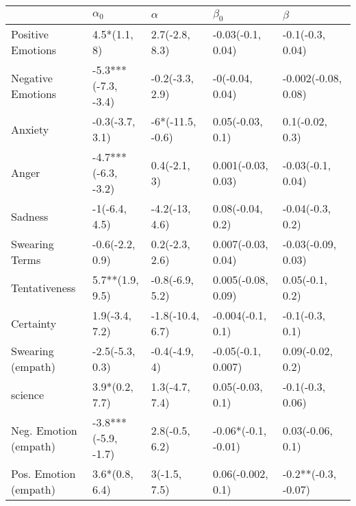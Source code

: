 \begin{tabular}{lllll}
\toprule
{} &           $\alpha_0$ &          $\alpha$ &            $\beta_0$ &              $\beta$ \\
\midrule
Positive Emotions     &         4.5*(1.1, 8) &    2.7(-2.8, 8.3) &    -0.03(-0.1, 0.04) &     -0.1(-0.3, 0.04) \\
Negative Emotions     &  -5.3***(-7.3, -3.4) &   -0.2(-3.3, 2.9) &      -0(-0.04, 0.04) &  -0.002(-0.08, 0.08) \\
Anxiety               &      -0.3(-3.7, 3.1) &  -6*(-11.5, -0.6) &     0.05(-0.03, 0.1) &      0.1(-0.02, 0.3) \\
Anger                 &  -4.7***(-6.3, -3.2) &      0.4(-2.1, 3) &   0.001(-0.03, 0.03) &    -0.03(-0.1, 0.04) \\
Sadness               &        -1(-6.4, 4.5) &    -4.2(-13, 4.6) &     0.08(-0.04, 0.2) &     -0.04(-0.3, 0.2) \\
Swearing Terms        &      -0.6(-2.2, 0.9) &    0.2(-2.3, 2.6) &   0.007(-0.03, 0.04) &   -0.03(-0.09, 0.03) \\
Tentativeness         &      5.7**(1.9, 9.5) &   -0.8(-6.9, 5.2) &   0.005(-0.08, 0.09) &      0.05(-0.1, 0.2) \\
Certainty             &       1.9(-3.4, 7.2) &  -1.8(-10.4, 6.7) &    -0.004(-0.1, 0.1) &      -0.1(-0.3, 0.1) \\
Swearing (empath)     &      -2.5(-5.3, 0.3) &     -0.4(-4.9, 4) &   -0.05(-0.1, 0.007) &     0.09(-0.02, 0.2) \\
science               &       3.9*(0.2, 7.7) &    1.3(-4.7, 7.4) &     0.05(-0.03, 0.1) &     -0.1(-0.3, 0.06) \\
Neg. Emotion (empath) &  -3.8***(-5.9, -1.7) &    2.8(-0.5, 6.2) &  -0.06*(-0.1, -0.01) &     0.03(-0.06, 0.1) \\
Pos. Emotion (empath) &       3.6*(0.8, 6.4) &      3(-1.5, 7.5) &    0.06(-0.002, 0.1) &  -0.2**(-0.3, -0.07) \\
\bottomrule
\end{tabular}
